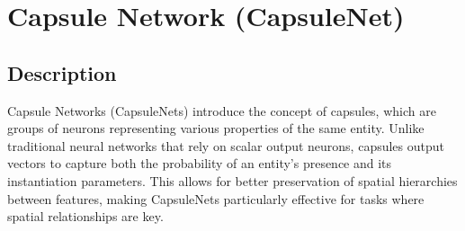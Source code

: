 \chapter{Capsule Network (CapsuleNet)}

\section{Description}
Capsule Networks (CapsuleNets) introduce the concept of capsules, which are groups of neurons representing various properties of the same entity. Unlike traditional neural networks that rely on scalar output neurons, capsules output vectors to capture both the probability of an entity's presence and its instantiation parameters. This allows for better preservation of spatial hierarchies between features, making CapsuleNets particularly effective for tasks where spatial relationships are key.

